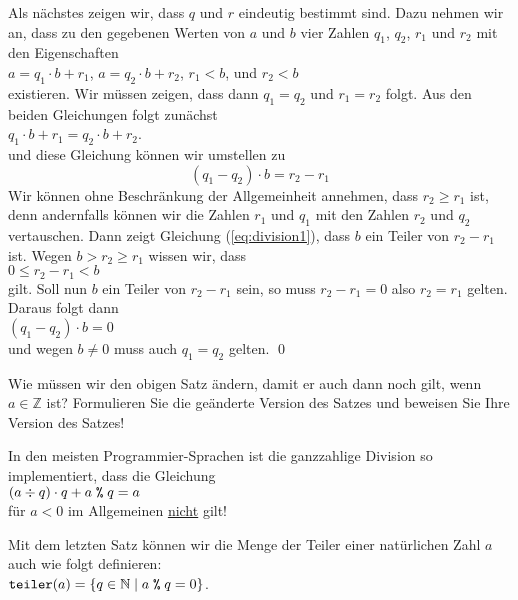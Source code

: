 Als nächstes zeigen wir, dass $q$ und $r$ eindeutig bestimmt sind.  Dazu nehmen wir an,
dass zu den gegebenen Werten von $a$ und $b$ vier Zahlen $q_1$, $q_2$, $r_1$ und $r_2$ mit den
Eigenschaften 
\\[0.2cm]
\hspace*{1.3cm}
$a = q_1 \cdot b + r_1$, \quad
$a = q_2 \cdot b + r_2$, \quad 
$r_1 < b$, \quad und \quad $r_2 < b$
\\[0.2cm]
existieren.  Wir müssen zeigen, dass dann $q_1 = q_2$ und $r_1 = r_2$ folgt.  Aus den beiden
Gleichungen folgt zunächst
\\[0.2cm]
\hspace*{1.3cm}
$q_1 \cdot b + r_1 = q_2 \cdot b + r_2$.
\\[0.2cm]
und diese Gleichung können wir umstellen zu
\begin{equation}
  \label{eq:division1}
  (q_1 - q_2) \cdot b = r_2 - r_1  
\end{equation}
Wir können  ohne Beschränkung der Allgemeinheit annehmen, dass $r_2 \geq r_1$ ist, denn andernfalls
können wir die Zahlen $r_1$ und $q_1$ mit den Zahlen $r_2$ und $q_2$ vertauschen.  Dann zeigt
Gleichung (\ref{eq:division1}), dass $b$ ein Teiler von $r_2 - r_1$ ist.  Wegen $b > r_2 \geq r_1$ 
wissen wir, dass
\\[0.2cm]
\hspace*{1.3cm}
$0 \leq r_2 - r_1 < b$
\\[0.2cm]
gilt.  Soll nun $b$ ein Teiler von $r_2 - r_1$ sein, so muss $r_2 - r_1 = 0$ also $r_2 = r_1$
gelten.  Daraus folgt dann
\\
\hspace*{1.3cm}
$(q_1 - q_2) \cdot b = 0$  
\\[0.2cm]
und wegen $b \not= 0$ muss auch $q_1 = q_2$ gelten. 
\qed

\exercise
Wie müssen wir den obigen Satz ändern, damit er auch dann noch gilt, wenn  $a \in \mathbb{Z}$ ist?
Formulieren Sie die geänderte Version des Satzes und beweisen Sie Ihre Version des Satzes!

\remark
In den meisten Programmier-Sprachen ist die ganzzahlige Division so implementiert, dass
die Gleichung 
\\[0.2cm]
\hspace*{1.3cm}
$(a \div q) \cdot q + a \;\texttt{\%}\; q = a$
\\[0.2cm]
für $a < 0$ im Allgemeinen \underline{nicht} gilt!

\vspace*{0.3cm}
\noindent
Mit dem letzten Satz können wir die Menge der Teiler einer natürlichen Zahl $a$ auch wie folgt definieren:
\\[0.2cm]
\hspace*{1.3cm}
$\texttt{teiler}(a) = \{ q \in \mathbb{N} \mid a \;\texttt{\%}\; q = 0 \}$.
\vspace*{0.3cm}


